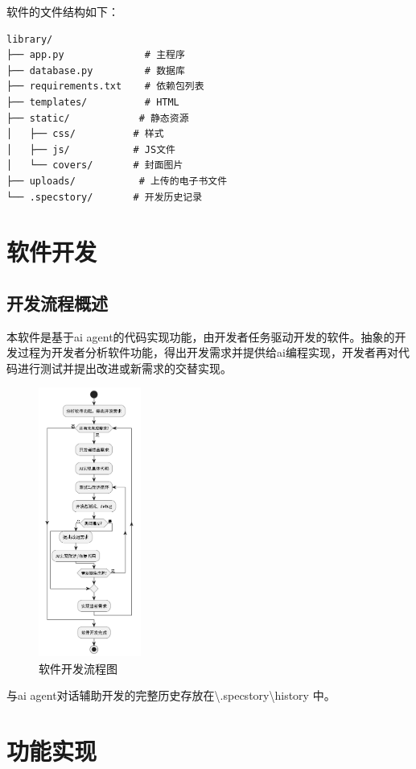\documentclass{SYSUReport}
\begin{document}
软件的文件结构如下：
\begin{verbatim}
library/
├── app.py              # 主程序
├── database.py         # 数据库
├── requirements.txt    # 依赖包列表
├── templates/          # HTML
├── static/            # 静态资源
│   ├── css/          # 样式
│   ├── js/           # JS文件
│   └── covers/       # 封面图片
├── uploads/           # 上传的电子书文件
└── .specstory/       # 开发历史记录
\end{verbatim}

\vspace*{1cm}
\section{软件开发}
\subsection{开发流程概述}
本软件是基于ai agent的代码实现功能，由开发者任务驱动开发的软件。抽象的开发过程为开发者分析软件功能，得出开发需求并提供给ai编程实现，开发者再对代码进行测试并提出改进或新需求的交替实现。

\begin{figure}[H]
    \centering
    \includegraphics[width=0.3\textwidth]{figures/流程.png}
    \caption{软件开发流程图}
    \label{fig:flow}
\end{figure}

与ai agent对话辅助开发的完整历史存放在\textbackslash .specstory\textbackslash history 中。


\section{功能实现}
\end{document}
